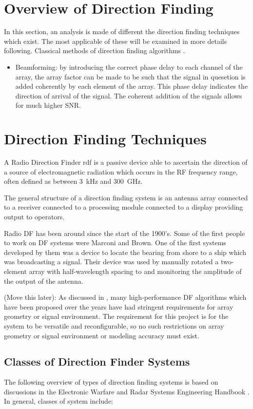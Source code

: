\section{Overview of Direction Finding}
In this section, an analysis is made of different the direction finding techniques which exist. The most applicable of these will be examined in more details following.
Classical methods of direction finding algorithms \cite{tuncer2009classical}.
\begin{itemize}
	\item Beamforming: by introducing the correct phase delay to each channel of the array, the array factor can be made to be such that the signal in quesetion is added coherently by each element of the array.
		This phase delay indicates the direction of arrival of the signal. The coherent addition of the signals allows for much higher SNR. 
\end{itemize}

\section{Direction Finding Techniques}
A Radio Direction Finder \gls{rdf} is a passive device able to ascertain the direction of a source of electromagnetic radiation which occurs in the RF frequency range, often defined as between \SI{3}{\kilo\hertz} and \SI{300}{\giga\hertz}. 

The general structure of a direction finding system is an antenna array connected to a receiver connected to a processing module connected to a display providing output to operators.

Radio DF has been around since the start of the 1900's. Some of the first people to work on DF  systems were Marconi and Brown. One of the first systems developed by them was a device to locate the bearing from shore to a ship which was broadcasting a signal. Their device was used by manually rotated a two-element array with half-wavelength spacing to and monitoring the amplitude of the output of the antenna.

(Move this later): As discussed in \cite{farrier1990direction}, many high-performance DF algorithms which have been proposed over the years have had stringent requirements for array geometry or signal environment. The requirement for this project is for the system to be versatile and reconfigurable, so no such restrictions on array geometry or signal environment or modeling accuracy must exist. 

\subsection{Classes of Direction Finder Systems}
The following overview of types of direction finding systems is based on discussions in the Electronic Warfare and Radar Systems Engineering Handbook \cite{center2012electronic}.
In general, classes of system include:

